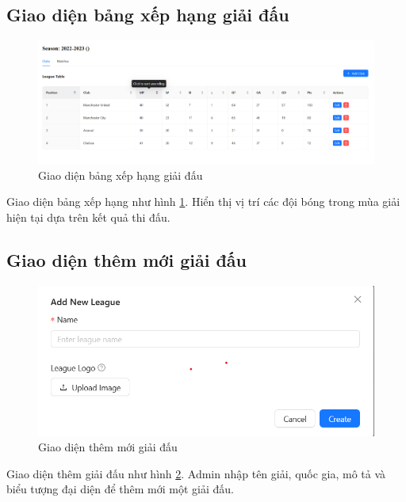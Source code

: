 \documentclass[../BTL.tex]{subfiles}
\begin{document}
\subsection{Giao diện bảng xếp hạng giải đấu}
\begin{figure}
    \centering
    \includegraphics[width=1\linewidth]{Hinhve/admin_league_table.png}
    \caption{Giao diện bảng xếp hạng giải đấu}
    \label{fig:admin_league_table}
\end{figure}
Giao diện bảng xếp hạng như hình \ref{fig:admin_league_table}. Hiển thị vị trí các đội bóng trong mùa giải hiện tại dựa trên kết quả thi đấu.

\subsection{Giao diện thêm mới giải đấu}
\begin{figure}
    \centering
    \includegraphics[width=1\linewidth]{Hinhve/admin_add_league.png}
    \caption{Giao diện thêm mới giải đấu}
    \label{fig:admin_add_league}
\end{figure}
Giao diện thêm giải đấu như hình \ref{fig:admin_add_league}. Admin nhập tên giải, quốc gia, mô tả và biểu tượng đại diện để thêm mới một giải đấu.
\end{document}
